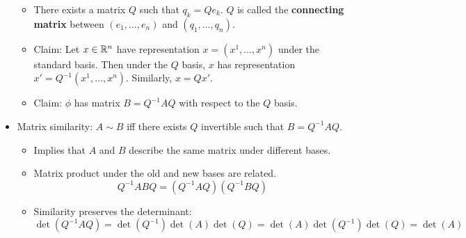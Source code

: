 \documentclass[../notes.tex]{subfiles}
\begin{document}
\begin{itemize}
    \begin{itemize}
        \item There exists a matrix $Q$ such that $q_k=Qe_k$. $Q$ is called the \textbf{connecting matrix} between $(e_1,\dots,e_n)$ and $(q_1,\dots,q_n)$.
        \item Claim: Let $x\in\mathbb{R}^n$ have representation $x=(x^1,\dots,x^n)$ under the standard basis. Then under the $Q$ basis, $x$ has representation $x'=Q^{-1}(x^1,\dots,x^n)$. Similarly, $x=Qx'$.
        \item Claim: $\phi$ has matrix $B=Q^{-1}AQ$ with respect to the $Q$ basis.
    \end{itemize}
    \item Matrix similarity: $A\sim B$ iff there exists $Q$ invertible such that $B=Q^{-1}AQ$.
    \begin{itemize}
        \item Implies that $A$ and $B$ describe the same matrix under different bases.
        \item Matrix product under the old and new bases are related.
        \begin{equation*}
            Q^{-1}ABQ = (Q^{-1}AQ)(Q^{-1}BQ)
        \end{equation*}
        \item Similarity preserves the determinant:
        \begin{equation*}
            \det(Q^{-1}AQ) = \det(Q^{-1})\det(A)\det(Q)
            = \det(A)\det(Q^{-1})\det(Q)
            = \det(A)
        \end{equation*}
    \end{itemize}
\end{itemize}
\end{document}
